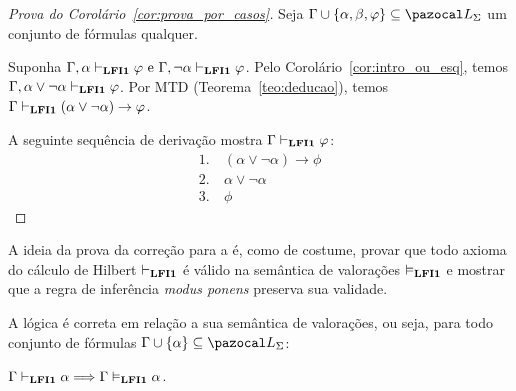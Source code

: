     \begin{proof}[Prova do Corolário~\ref{cor:prova_por_casos}]
        Seja $\Gamma \cup \{\alpha, \beta, \phi\} \subseteq \ling{}$ um conjunto de fórmulas qualquer.

        Suponha $\Gamma, \alpha \vdash_{{\normalfont\textbf{LFI1}}{}} \varphi \text{ e }\Gamma, \neg\alpha \vdash_{{\normalfont\textbf{LFI1}}{}} \varphi$. Pelo Corolário~\ref{cor:intro_ou_esq}, temos $\Gamma, \alpha \lor \neg \alpha \vdash_{{\normalfont\textbf{LFI1}}{}} \varphi$. Por MTD (Teorema~\ref{teo:deducao}), temos $\Gamma \vdash_{{\normalfont\textbf{LFI1}}{}} (\alpha \lor \neg \alpha) \to \varphi$.

        A seguinte sequência de derivação mostra $\Gamma\vdash_{{\normalfont\textbf{LFI1}}{}} \varphi$:
        \begin{align*}
            1. ~& (\alpha \lor \neg \alpha) \to \phi\tag{MTD aplicado à suposição} \\
            2. ~& \alpha \lor \neg \alpha \tag{Ax10} \\
            3. ~& \phi \tag{MP 1,2}
        \end{align*}
    \end{proof}

    A ideia da prova da correção para a \lfium{} é, como de costume, provar que todo axioma do cálculo de Hilbert $\vdash_{{\normalfont\textbf{LFI1}}{}}$ é válido na semântica de valorações $\vDash_{{\normalfont\textbf{LFI1}}{}}$ e mostrar que a regra de inferência \textit{modus ponens} preserva sua validade.

    \begin{teorema}[Correção]\label{teo:correcao}
        A lógica {\normalfont\lfium{}} é correta em relação a sua semântica de valorações, ou seja, para todo conjunto de fórmulas $\Gamma \cup \{\alpha\} \subseteq \ling{}$:

        \centering
        {\normalfont{} $\Gamma \vdash_{{\normalfont\textbf{LFI1}}{}} \alpha \Longrightarrow \Gamma \vDash_{{\normalfont\textbf{LFI1}}{}} \alpha$.}
    \end{teorema}

